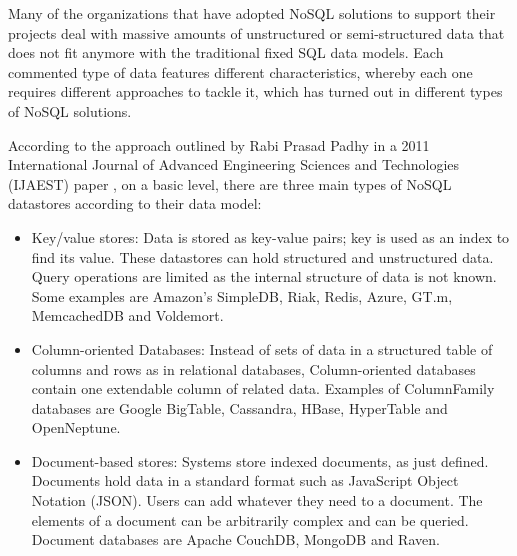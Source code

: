Many of the organizations that have adopted NoSQL solutions to support their projects deal with massive amounts of unstructured or semi-structured data that does not fit anymore with the traditional fixed SQL data models. Each commented type of data features different characteristics, whereby each one requires different approaches to tackle it, which has turned out in different types of NoSQL solutions.
\par
According to the approach outlined by Rabi Prasad Padhy in a 2011 International Journal of Advanced Engineering Sciences and Technologies (IJAEST) paper \cite{padhy2011rdbms}, on a basic level, there are three main types of NoSQL datastores according to their data model:
\begin{itemize}
\item Key/value stores: Data is stored as key-value pairs; key is used as an index to find its value. These datastores can hold structured and unstructured data. Query operations are limited as the internal structure of data is not known. Some examples are Amazon's SimpleDB, Riak, Redis, Azure, GT.m, MemcachedDB and Voldemort.
\item Column-oriented Databases: Instead of sets of data in a structured table of columns and rows as in relational databases, Column-oriented databases contain one extendable column of related data. Examples of ColumnFamily databases are Google BigTable, Cassandra, HBase, HyperTable and OpenNeptune.
\item Document-based stores: Systems store indexed documents, as just defined. Documents hold data in a standard format such as JavaScript Object Notation (JSON). Users can add whatever they need to a document. The elements of a document can be arbitrarily complex and can be queried. Document databases are Apache CouchDB, MongoDB and Raven.
\end{itemize}



